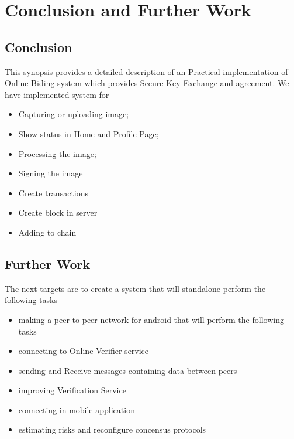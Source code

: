 \chapter{Conclusion and Further Work}
\label{ch:5}

\section{Conclusion}
This synopsis provides a detailed description of an Practical implementation of Online Biding system which provides Secure Key Exchange and agreement. We have implemented system for
\begin{itemize}
\item Capturing or uploading image;
\item Show status in Home and Profile Page;
\item Processing the image;
\item Signing the image
\item Create transactions
\item Create block in server
\item Adding to chain
\end{itemize}

\section{Further Work}
The next targets are to create a system that will standalone perform the following tasks
\begin{itemize}
\item making a peer-to-peer network for android that will perform the following tasks
\item connecting to Online Verifier service
\item sending and Receive messages containing data between peers
\item improving Verification Service
\item connecting in mobile application
\item estimating risks and reconfigure concensus protocols
\end{itemize}
